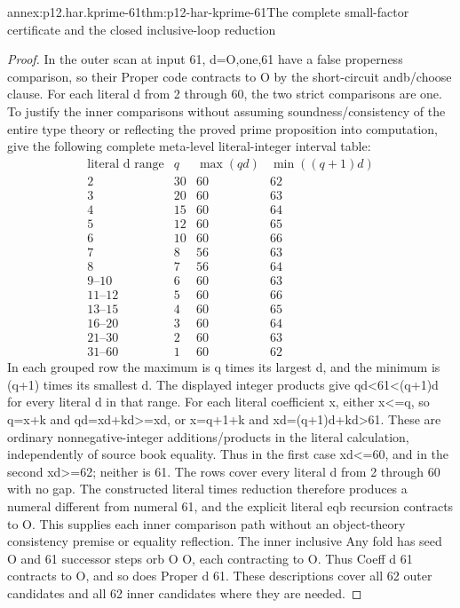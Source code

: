 \begin{annexitem}{annex:p12.har.kprime-61}{thm:p12-har-kprime-61}{The complete small-factor certificate and the closed inclusive-loop reduction}
\begin{proof}
In the outer scan at input 61, d=O,one,61 have a false properness
comparison, so their Proper code contracts to O by the short-circuit
andb/choose clause. For each literal d from 2 through 60, the two
strict comparisons are one. To justify the inner comparisons without
assuming soundness/consistency of the entire type theory or reflecting
the proved prime proposition into computation, give the following
complete meta-level literal-integer interval table:
\[
\begin{array}{c|c|c|c}
 \text{literal d range}&q&\max(qd)&\min((q+1)d)\\\hline
 2&30&60&62\\
 3&20&60&63\\
 4&15&60&64\\
 5&12&60&65\\
 6&10&60&66\\
 7&8&56&63\\
 8&7&56&64\\
 9\text{--}10&6&60&63\\
 11\text{--}12&5&60&66\\
 13\text{--}15&4&60&65\\
 16\text{--}20&3&60&64\\
 21\text{--}30&2&60&63\\
 31\text{--}60&1&60&62
\end{array}
\]
In each grouped row the maximum is q times its largest d, and the
minimum is (q+1) times its smallest d. The displayed integer products
give qd<61<(q+1)d for every literal d in that range.
For each literal coefficient x, either x<=q, so q=x+k and
qd=xd+kd>=xd, or x=q+1+k and xd=(q+1)d+kd>61.
These are ordinary nonnegative-integer additions/products in the
literal calculation, independently of source book equality. Thus in
the first case xd<=60, and in the second xd>=62; neither is 61.
The rows cover every literal d from 2 through 60 with no gap.
The constructed literal times reduction therefore produces a numeral
different from numeral 61, and the explicit literal eqb recursion
contracts to O. This supplies each inner comparison path without
an object-theory consistency premise or equality reflection.
The inner inclusive Any fold has seed O and 61 successor
steps orb O O, each contracting to O. Thus Coeff d 61 contracts
to O, and so does Proper d 61. These descriptions cover all 62
outer candidates and all 62 inner candidates where they are needed.


\end{proof}
\end{annexitem}
